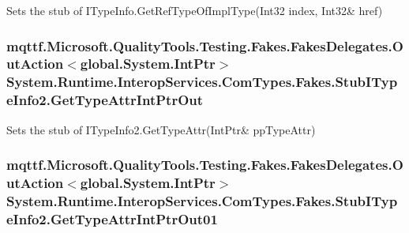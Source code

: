 Sets the stub of I\-Type\-Info.\-Get\-Ref\-Type\-Of\-Impl\-Type(Int32 index, Int32\& href)

\hypertarget{class_system_1_1_runtime_1_1_interop_services_1_1_com_types_1_1_fakes_1_1_stub_i_type_info2_a3e85ae173aebec2e32b4145b6021851b}{
\subsubsection[{Get\-Type\-Attr\-Int\-Ptr\-Out}]{\setlength{\rightskip}{0pt plus 5cm}mqttf.\-Microsoft.\-Quality\-Tools.\-Testing.\-Fakes.\-Fakes\-Delegates.\-Out\-Action$<$global.\-System.\-Int\-Ptr$>$ System.\-Runtime.\-Interop\-Services.\-Com\-Types.\-Fakes.\-Stub\-I\-Type\-Info2.\-Get\-Type\-Attr\-Int\-Ptr\-Out}}\label{class_system_1_1_runtime_1_1_interop_services_1_1_com_types_1_1_fakes_1_1_stub_i_type_info2_a3e85ae173aebec2e32b4145b6021851b}


Sets the stub of I\-Type\-Info2.\-Get\-Type\-Attr(Int\-Ptr\& pp\-Type\-Attr)

\hypertarget{class_system_1_1_runtime_1_1_interop_services_1_1_com_types_1_1_fakes_1_1_stub_i_type_info2_a5d55ce1fa9d3aba99d512b04d0b24fd5}{
\subsubsection[{Get\-Type\-Attr\-Int\-Ptr\-Out01}]{\setlength{\rightskip}{0pt plus 5cm}mqttf.\-Microsoft.\-Quality\-Tools.\-Testing.\-Fakes.\-Fakes\-Delegates.\-Out\-Action$<$global.\-System.\-Int\-Ptr$>$ System.\-Runtime.\-Interop\-Services.\-Com\-Types.\-Fakes.\-Stub\-I\-Type\-Info2.\-Get\-Type\-Attr\-Int\-Ptr\-Out01}}\label{class_system_1_1_runtime_1_1_interop_services_1_1_com_types_1_1_fakes_1_1_stub_i_type_info2_a5d55ce1fa9d3aba99d512b04d0b24fd5}


